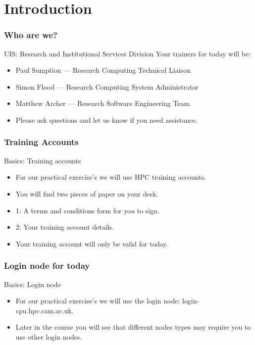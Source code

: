 \part{Introduction}
\begin{frame}
\partpage
\end{frame}


\section{Who are we?}
\begin{frame}{UIS: Research and Institutional Services Division}
Your trainers for today will be:\\
\begin{itemize}
  \item Paul Sumption --- Research Computing Technical Liaison
    \item Simon Flood --- Research Computing System Administrator
  \item Matthew Archer --- Research Software Engineering Team
  \item\alert{Please ask questions and let us know if you need assistance.}
\end{itemize}
\end{frame}

\section{Training Accounts}
\begin{frame}{Basics: Training accounts}
\begin{itemize}
\item{\alert{For our practical exercise's we will use HPC training accounts.}}
\pause
\item{You will find two pieces of paper on your desk.}
\pause
\item{1: A terms and conditions form for you to sign.}
\pause
\item{2: Your training account details.}
\pause
\item{Your training account will only be valid for today.}
\end{itemize}
\end{frame}

\section{Login node for today}
\begin{frame}{Basics: Login node}
\begin{itemize}
\item{\alert{For our practical exercise's we will use the login node: login-cpu.hpc.cam.ac.uk.}}
\pause
\item{Later in the course you will see that different nodes types may require you to use other login nodes.}
\end{itemize}
\end{frame}

